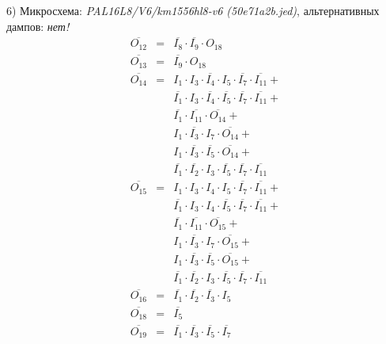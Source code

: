 \documentclass[a4paper,russian]{report}
\begin{document}
6) Микросхема: \emph{PAL16L8/V6/km1556hl8-v6  (50e71a2b.jed)}, альтернативных дампов: \emph{нет!}
\nopagebreak\begin{eqnarray*}
    \overline{O_{12}} & = & \overline{I_{8}} \cdotp \overline{I_{9}} \cdotp O_{18} \\
    \overline{O_{13}} & = & \overline{I_{9}} \cdotp O_{18} \\
    \overline{O_{14}} & = & I_{1} \cdotp I_{3} \cdotp \overline{I_{4}} \cdotp I_{5} \cdotp \overline{I_{7}} \cdotp \overline{I_{11}} + \\
	& &  \overline{I_{1}} \cdotp I_{3} \cdotp \overline{I_{4}} \cdotp \overline{I_{5}} \cdotp \overline{I_{7}} \cdotp \overline{I_{11}} + \\
	& &  \overline{I_{1}} \cdotp \overline{I_{11}} \cdotp \overline{O_{14}} + \\
	& &  I_{1} \cdotp \overline{I_{3}} \cdotp I_{7} \cdotp \overline{O_{14}} + \\
	& &  I_{1} \cdotp \overline{I_{3}} \cdotp \overline{I_{5}} \cdotp \overline{O_{14}} + \\
	& &  \overline{I_{1}} \cdotp \overline{I_{2}} \cdotp I_{3} \cdotp \overline{I_{5}} \cdotp \overline{I_{7}} \cdotp \overline{I_{11}} \\
    \overline{O_{15}} & = & I_{1} \cdotp I_{3} \cdotp I_{4} \cdotp I_{5} \cdotp \overline{I_{7}} \cdotp \overline{I_{11}} + \\
	& &  \overline{I_{1}} \cdotp I_{3} \cdotp I_{4} \cdotp \overline{I_{5}} \cdotp \overline{I_{7}} \cdotp \overline{I_{11}} + \\
	& &  \overline{I_{1}} \cdotp \overline{I_{11}} \cdotp \overline{O_{15}} + \\
	& &  I_{1} \cdotp \overline{I_{3}} \cdotp I_{7} \cdotp \overline{O_{15}} + \\
	& &  I_{1} \cdotp \overline{I_{3}} \cdotp \overline{I_{5}} \cdotp \overline{O_{15}} + \\
	& &  \overline{I_{1}} \cdotp \overline{I_{2}} \cdotp I_{3} \cdotp \overline{I_{5}} \cdotp \overline{I_{7}} \cdotp \overline{I_{11}} \\
    \overline{O_{16}} & = & \overline{I_{1}} \cdotp \overline{I_{2}} \cdotp \overline{I_{3}} \cdotp I_{5} \\
    \overline{O_{18}} & = & \overline{I_{5}} \\
    \overline{O_{19}} & = & \overline{I_{1}} \cdotp \overline{I_{3}} \cdotp \overline{I_{5}} \cdotp \overline{I_{7}} \\
 \end{eqnarray*}
\pagebreak[1]
\end{document}
